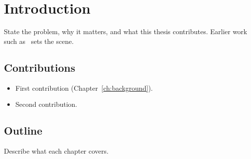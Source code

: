 \chapter{Introduction}
\label{ch:intro}

State the problem, why it matters, and what this thesis contributes.
Earlier work such as~\cite{mcmahan2017communication} sets the scene.

\section{Contributions}

\begin{itemize}
  \item First contribution (Chapter~\ref{ch:background}).
  \item Second contribution.
\end{itemize}

\section{Outline}

Describe what each chapter covers.
